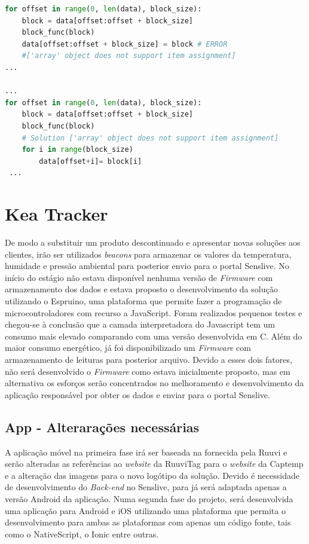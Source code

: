 \begin{lstlisting}[caption=Adaptação do Código para o equipamento Digi,label={py2},language=Python]
for offset in range(0, len(data), block_size):
    block = data[offset:offset + block_size]
    block_func(block)
    data[offset:offset + block_size] = block # ERROR 
    #['array' object does not support item assignment]
...

...
for offset in range(0, len(data), block_size):
    block = data[offset:offset + block_size]
    block_func(block)
    # Solution ['array' object does not support item assignment]
    for i in range(block_size)
        data[offset+i]= block[i]
 ...
\end{lstlisting}

\section {Kea Tracker}

\par De modo a substituir um produto descontinuado e apresentar novas soluções aos clientes, irão ser utilizados \textit{beacons} para armazenar os valores da temperatura, humidade e pressão ambiental para posterior envio para o portal Senslive. No início do estágio não estava disponível nenhuma versão de \textit{Firmware} com armazenamento dos dados e estava proposto o desenvolvimento da solução utilizando o Espruino, uma plataforma que permite fazer a programação de microcontroladores com recurso a JavaScript. Foram realizados pequenos testes e chegou-se à conclusão que a camada interpretadora do Javascript tem um consumo mais elevado comparando com uma versão desenvolvida em C. Além do maior consumo energético, já foi disponibilizado um \textit{Firmware} com armazenamento de leituras para posterior arquivo. Devido a esses dois fatores, não será desenvolvido o \textit{Firmware} como estava inicialmente proposto, mas em alternativa os esforços serão concentrados no melhoramento e desenvolvimento da aplicação responsável por obter os dados e enviar para o portal Senslive. 


\subsection{App - Alterarações necessárias}

\par A aplicação móvel na primeira fase irá ser baseada na fornecida pela Ruuvi e serão alteradas as referências ao \textit{website} da RuuviTag para o \textit{website} da Captemp e a alteração das imagens para o novo logótipo da solução. Devido é necessidade de desenvolvimento do \textit{Back-end} no Senslive, para já será adaptada apenas a versão Android da aplicação. Numa segunda fase do projeto, será desenvolvida uma aplicação para Android e iOS utilizando uma plataforma que permita o desenvolvimento para ambas as plataformas com apenas um código fonte, tais como o NativeScript\cite{nativescript}, o Ionic\cite{ionic} entre outras.

